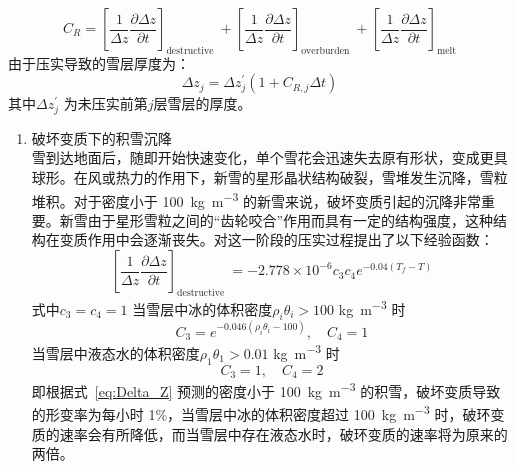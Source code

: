 \begin{equation}
{C}_{{R}}=\left[\frac{1}{\Delta {z}} \frac{\partial \Delta {z}}{\partial {t}}\right]_{\text {destructive }}+\left[\frac{1}{\Delta {z}} \frac{\partial \Delta {z}}{\partial {t}}\right]_{\text {overburden }}+\left[\frac{1}{\Delta {z}} \frac{\partial \Delta {z}}{\partial {t}}\right]_{\text{melt}}
\end{equation}
由于压实导致的雪层厚度为：
\begin{equation}
\Delta z_{j}=\Delta z_{j}^{\prime}\left(1+C_{R, j} \Delta t\right)
\end{equation}
其中$\Delta {z}_{{j}}^{\prime}$ 为未压实前第$j$层雪层的厚度。


\begin{enumerate}
\item 破坏变质下的积雪沉降\\
雪到达地面后，随即开始快速变化，单个雪花会迅速失去原有形状，变成更具球形。在风或热力的作用下，新雪的星形晶状结构破裂，雪堆发生沉降，雪粒堆积。对于密度小于 \qty{100}{kg.m^{-3}} 的新雪来说，破坏变质引起的沉降非常重要。新雪由于星形雪粒之间的“齿轮咬合”作用而具有一定的结构强度，这种结构在变质作用中会逐渐丧失。\citet{anderson1976point}对这一阶段的压实过程提出了以下经验函数：
\begin{equation}\label{eq:Delta_Z}
\left[\frac{1}{\Delta {z}} \frac{\partial \Delta {z}}{\partial {t}}\right]_{\text {destructive }}=-2.778 \times 10^{-6} {c}_{3} {c}_{4} {e}^{-0.04\left(T_f-T\right)}
\end{equation}
式中${c}_{3}={c}_{4}=1$
当雪层中冰的体积密度$\rho_{i} \theta_{i}>100$ \unit{kg.m^{-3}} 时
\begin{equation}
{C}_{3}={e}^{-0.046\left(\rho_{{i}} \theta_{{i}}-100\right)}, \quad {C}_{4}=1
\end{equation}
当雪层中液态水的体积密度$\rho_{1} \theta_{1}>0.01$ \unit{kg.m^{-3}} 时
\begin{equation}
{C}_{3}=1,\quad  {C}_{4}=2
\end{equation}
即根据式~\eqref{eq:Delta_Z} 预测的密度小于 \qty{100}{kg.m^{-3}} 的积雪，破坏变质导致的形变率为每小时 1\%，当雪层中冰的体积密度超过 \qty{100}{kg.m^{-3}} 时，破环变质的速率会有所降低，而当雪层中存在液态水时，破环变质的速率将为原来的两倍。


\end{enumerate}
